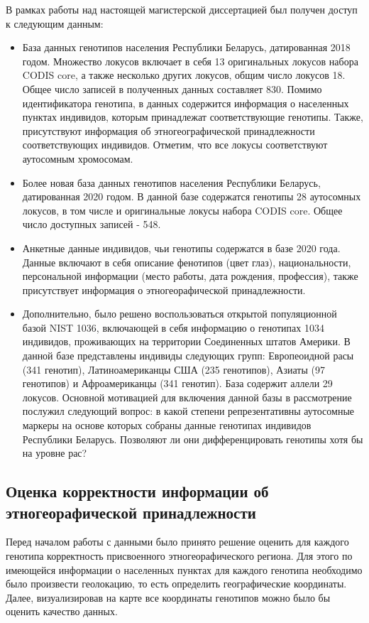 В рамках работы над настоящей магистерской диссертацией был получен доступ к следующим данным:
\begin{itemize}
\item База данных генотипов населения Республики Беларусь, датированная 2018 годом.
Множество локусов включает в себя 13 оригинальных локусов набора CODIS core, а также несколько
других локусов, общим число локусов 18. Общее число записей в полученных данных составляет 830.
Помимо идентификатора генотипа, в данных содержится информация о населенных пунктах индивидов, которым
принадлежат соответствующие генотипы. Также, присутствуют информация об этногеографической
принадлежности соответствующих индивидов. Отметим, что все локусы соответствуют аутосомным хромосомам.

\item Более новая база данных генотипов населения Республики Беларусь, датированная 2020 годом.
В данной базе содержатся генотипы 28 аутосомных локусов, в том числе и оригинальные локусы
набора CODIS core. Общее число доступных записей - 548.

\item Анкетные данные индивидов, чьи генотипы содержатся в базе 2020 года. Данные включают
в себя описание фенотипов (цвет глаз), национальности, персональной информации
(место работы, дата рождения, профессия), также присутствует информация о этногеорафической принадлежности.

\item Дополнительно, было решено воспользоваться открытой популяционной базой NIST 1036,
включающей в себя информацию о генотипах 1034 индивидов, проживающих на территории
Соединенных штатов Америки. В данной базе представлены индивиды следующих групп:
Европеоидной расы (341 генотип), Латиноамериканцы США (235 генотипов), Азиаты (97 генотипов)
и Афроамериканцы (341 генотип). База содержит аллели 29 локусов. Основной мотивацией для включения
данной базы в рассмотрение послужил следующий вопрос: в какой степени репрезентативны аутосомные
маркеры на основе которых собраны данные генотипах индивидов Республики Беларусь. Позволяют ли они
дифференцировать генотипы хотя бы на уровне рас?
\end{itemize}

\subsection{Оценка корректности информации об этногеорафической принадлежности}

Перед началом работы с данными было принято решение оценить для каждого генотипа
корректность присвоенного этногеорафического региона. Для этого по имеющейся информации
о населенных пунктах для каждого генотипа необходимо было произвести геолокацию, то есть
определить географические координаты. Далее, визуализировав на карте все координаты генотипов
можно было бы оценить качество данных.

